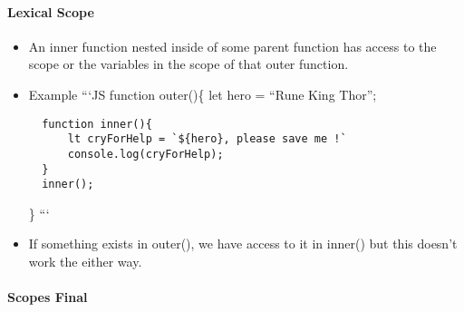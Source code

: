 \documentclass[
  paper=a4,
  ,captions=tableheading
]{scrartcl}
\begin{document}
\hypertarget{lexical-scope}{%
\paragraph{Lexical Scope}\label{lexical-scope}}

\begin{itemize}
\item
  An inner function nested inside of some parent function has access to
  the scope or the variables in the scope of that outer function.
\item
  Example ```JS function outer()\{ let hero = ``Rune King Thor'';

\begin{verbatim}
  function inner(){
      lt cryForHelp = `${hero}, please save me !`
      console.log(cryForHelp);
  }
  inner();
\end{verbatim}

  \} ```
\item
  If something exists in outer(), we have access to it in inner() but
  this doesn't work the either way.
\end{itemize}

\hypertarget{scopes-final}{%
\paragraph{Scopes Final}\label{scopes-final}}
\end{document}
